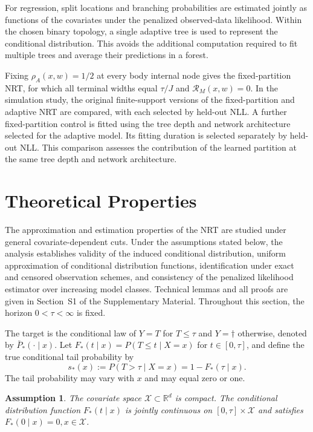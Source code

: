 \documentclass[11pt]{article}
\numberwithin{equation}{section}
\newtheorem{assum}{Assumption}
\begin{document}
For regression, split locations and branching probabilities are estimated jointly as functions of the covariates under the penalized observed-data likelihood. Within the chosen binary topology, a single adaptive tree is used to represent the conditional distribution. This avoids the additional computation required to fit multiple trees and average their predictions in a forest.

Fixing $\rho_A(x,w)=1/2$ at every body internal node gives the fixed-partition NRT, for which all terminal widths equal $\tau/J$ and $\mathcal R_M(x,w)=0$. In the simulation study, the original finite-support versions of the fixed-partition and adaptive NRT are compared, with each selected by held-out NLL. A further fixed-partition control is fitted using the tree depth and network architecture selected for the adaptive model. Its fitting duration is selected separately by held-out NLL. This comparison assesses the contribution of the learned partition at the same tree depth and network architecture.


\section{Theoretical Properties}
\label{sec:theory}

The approximation and estimation properties of the NRT are studied under general covariate-dependent cuts. Under the assumptions stated below, the analysis establishes validity of the induced conditional distribution, uniform approximation of conditional distribution functions, identification under exact and censored observation schemes, and consistency of the penalized likelihood estimator over increasing model classes. Technical lemmas and all proofs are given in Section~S1 of the Supplementary Material. Throughout this section, the horizon $0<\tau<\infty$ is fixed.

The target is the conditional law of $Y=T$ for $T\leq\tau$ and $Y=\dagger$ otherwise, denoted by $\bar P_*(\cdot\mid x)$. Let $F_*(t\mid x)=P(T\leq t\mid X=x)$ for $t\in[0,\tau]$, and define the true conditional tail probability by
\[
    s_*(x):=P(T>\tau\mid X=x)=1-F_*(\tau\mid x).
\]
The tail probability may vary with $x$ and may equal zero or one.

\begin{assum}
\label{assum:nrt_target}
The covariate space $\mathcal X\subset\mathbb R^d$ is compact. The conditional distribution function $F_*(t\mid x)$ is jointly continuous on $[0,\tau]\times\mathcal X$ and satisfies $F_*(0\mid x)=0, x\in\mathcal X$.
\end{assum}
\end{document}
